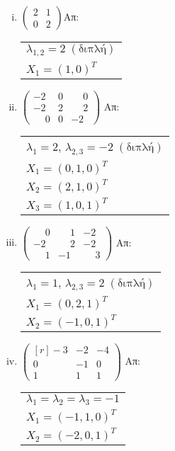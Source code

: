 \documentclass[a4paper,table]{report}
\begin{document}
\begin{enumerate}
\begin{enumerate}[i)]

\item $\begin{pmatrix}
2 & 1 \\
0 & 2
\end{pmatrix}$\hfill Απ: \begin{tabular}{l}
$\lambda_{1,2}=2 \; (\text{διπλή})$ \\
$X_1=(1,0)^T$ \\
\end{tabular}

\item $\begin{pmatrix}
-2 & 0 & \phantom{-}0 \\
-2 & 2 & \phantom{-}2 \\
\phantom{-}0 & 0 & -2
\end{pmatrix}$ \hfill Απ: \begin{tabular}{l}
$\lambda_1=2$, $\lambda_{2,3}=-2 \; (\text{διπλή})$ \\ 
$X_1=(0,1,0)^T$ \\
$X_2=(2,1,0)^T$ \\
$X_3=(1,0,1)^T$
\end{tabular}



\item $\begin{pmatrix}
\phantom{-}0 & \phantom{-}1 & -2 \\
-2 & \phantom{-}2 & -2 \\
\phantom{-}1 & -1 & \phantom{-}3
\end{pmatrix}$ \hfill Απ: \begin{tabular}{l}
$\lambda_1=1$, $\lambda_{2,3}=2 \; (\text{διπλή})$ \\ 
$X_1=(0,2,1)^T$ \\
$X_2=(-1,0,1)^T$ \\
\end{tabular}

\item $ \begin{pmatrix*}[r]
		-3 & -2 & -4 \\
		0 & -1 & 0 \\
		1 & 1 & 1 
\end{pmatrix*}$ \hfill Απ: \begin{tabular}{l}
$ \lambda_{1} = \lambda_{2} = \lambda_{3} = -1 $ \\
$ X_{1} = (-1,1,0)^T$ \\
$ X_{2} = (-2,0,1)^{T} $
\end{tabular}


\end{enumerate}
\end{enumerate}
\end{document}
